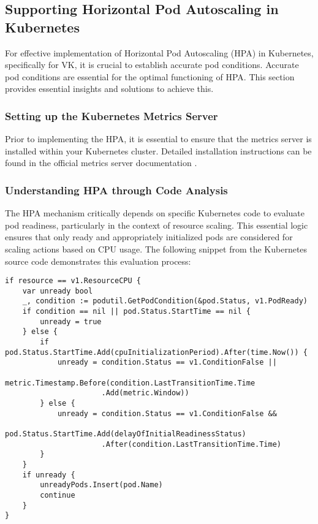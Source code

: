 \subsection{Supporting Horizontal Pod Autoscaling in Kubernetes}
\label{hpa}

For effective implementation of Horizontal Pod Autoscaling (HPA) in Kubernetes, specifically for VK, it is crucial to establish accurate pod conditions. Accurate pod conditions are essential for the optimal functioning of HPA. This section provides essential insights and solutions to achieve this.

\subsubsection{Setting up the Kubernetes Metrics Server}

Prior to implementing the HPA, it is essential to ensure that the metrics server is installed within your Kubernetes cluster. Detailed installation instructions can be found in the official metrics server documentation \cite{metrics-server}.

\subsubsection{Understanding HPA through Code Analysis}

The HPA mechanism critically depends on specific Kubernetes code to evaluate pod readiness, particularly in the context of resource scaling. This essential logic ensures that only ready and appropriately initialized pods are considered for scaling actions based on CPU usage. The following snippet from the Kubernetes source code \cite{k8s-hpa} demonstrates this evaluation process:

\begin{verbatim}
if resource == v1.ResourceCPU {
    var unready bool
    _, condition := podutil.GetPodCondition(&pod.Status, v1.PodReady)
    if condition == nil || pod.Status.StartTime == nil {
        unready = true
    } else {
        if pod.Status.StartTime.Add(cpuInitializationPeriod).After(time.Now()) {
            unready = condition.Status == v1.ConditionFalse || 
                      metric.Timestamp.Before(condition.LastTransitionTime.Time
                      .Add(metric.Window))
        } else {
            unready = condition.Status == v1.ConditionFalse && 
                      pod.Status.StartTime.Add(delayOfInitialReadinessStatus)
                      .After(condition.LastTransitionTime.Time)
        }
    }
    if unready {
        unreadyPods.Insert(pod.Name)
        continue
    }
}
\end{verbatim}

